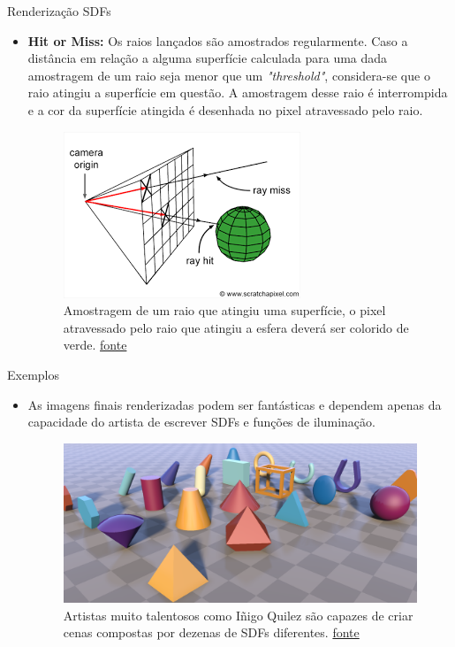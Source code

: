 \documentclass[2pt]{beamer} %
\begin{document}
\begin{frame}{Renderização SDFs}


\begin{itemize}
   
\item \textbf{Hit or Miss:} Os raios lançados são amostrados regularmente. Caso a distância em relação a alguma superfície calculada para uma dada amostragem de um raio seja menor que um \textit{"threshold"}, considera-se que o raio atingiu a superfície em questão. A amostragem desse raio é interrompida e a cor da superfície atingida é desenhada no pixel atravessado pelo raio.
\begin{figure}
    \centering
    \includegraphics[width=0.4\linewidth]{imgs/hitOrMiss.png}
    \caption{Amostragem de um raio que atingiu uma superfície, o pixel atravessado pelo raio que atingiu a esfera deverá ser colorido de verde.
    \href{https://www.scratchapixel.com/lessons/3d-basic-rendering/ray-tracing-overview/ray-tracing-rendering-technique-overview.html}{fonte}
    }
    \label{fig:enter-label}
    \end{figure}
\end{itemize}
\end{frame}

\begin{frame}{Exemplos}
\begin{itemize}
\item As imagens finais renderizadas podem ser fantásticas e dependem apenas da capacidade do artista de escrever SDFs e funções de iluminação.

\begin{figure}
    \centering
    \includegraphics[width=0.5\linewidth]{imgs/iq.png}
    \caption{Artistas muito talentosos como Iñigo Quilez são capazes de criar cenas compostas por dezenas de SDFs diferentes. \href{https://www.shadertoy.com/view/Xds3zN}{fonte}}
    \label{fig:enter-label}
\end{figure}

\end{itemize}
\end{frame}
\end{document}
